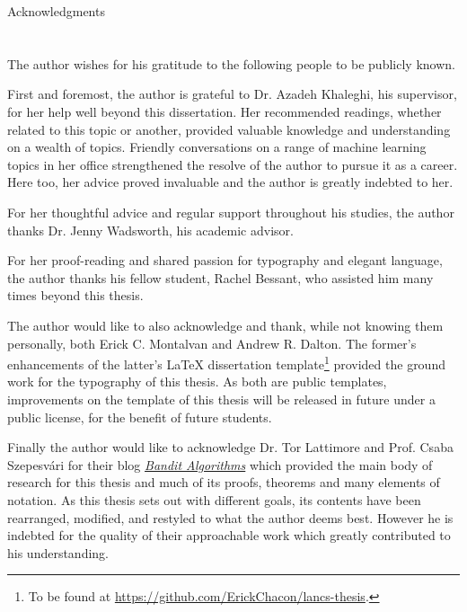 
	
{ \huge Acknowledgments}\\
\\
\\
The author wishes for his gratitude to the following people to be publicly known. 
\vspace{1em}
\par First and foremost, the author is grateful to Dr. Azadeh Khaleghi, his supervisor, for her help well beyond this dissertation. Her recommended readings, whether related to this topic or another, provided valuable knowledge and understanding on a wealth of topics. Friendly conversations on a range of machine learning topics in her office strengthened the resolve of the author to pursue it as a career. Here too, her advice proved invaluable and the author is greatly indebted to her. 
\par For her thoughtful advice and regular support throughout his studies, the author thanks Dr. Jenny Wadsworth, his academic advisor.  
\par For her proof-reading and shared passion for typography and elegant language, the author thanks his fellow student, Rachel Bessant, who assisted him many times beyond this thesis.  
\par The author would like to also acknowledge and thank, while not knowing them personally, both Erick C. Montalvan and Andrew R. Dalton. The former's enhancements of the latter's {\LaTeX } dissertation template\footnote{To be found at {\url{https://github.com/ErickChacon/lancs-thesis}}.} provided the ground work for the typography of this thesis. As both are public templates, improvements on the template of this thesis will be released in future under a public license, for the benefit of future students. 
\par Finally the author would like to acknowledge Dr. Tor Lattimore and Prof. Csaba Szepesv{\'a}ri for their blog {\href{http://banditalgs.com}{{\em Bandit Algorithms}}} which provided the main body of research for this thesis and much of its proofs, theorems and many elements of notation. As this thesis sets out with different goals, its contents have been rearranged, modified, and restyled to what the author deems best. However he is indebted for the quality of their approachable work which greatly contributed to his understanding. 

	
\vfill